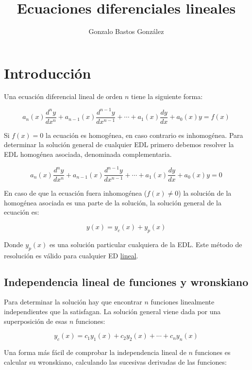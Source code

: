 \documentclass[a4paper,12pt,titlepage]{article}
\title{Ecuaciones diferenciales lineales}
\author{Gonzalo Bastos González}
\begin{document}
\section{Introducción}

Una ecuación diferencial lineal de orden $n$ tiene la siguiente forma:

\begin{equation}
    a_n(x) \frac{d^n y}{d x^n}+a_{n-1}(x) \frac{d^{n-1} y}{d x^{n-1}}+\cdots+a_1(x) \frac{d y}{d x}+a_0(x) y=f(x)
\end{equation}

Si $f(x)=0$ la ecuación es homogénea, en caso contrario es inhomogénea. Para determinar la solución general de cualquier EDL primero debemos resolver la EDL homogénea asociada, denominada complementaria.

\begin{equation}
    a_n(x) \frac{d^n y}{d x^n}+a_{n-1}(x) \frac{d^{n-1} y}{d x^{n-1}}+\cdots+a_1(x) \frac{d y}{d x}+a_0(x) y= 0
\end{equation}

\par En caso de que la ecuación fuera inhomogénea ($f(x)\neq 0$) la solución de la homogénea asociada es una parte de la solución, la solución general de la ecuación es:

\begin{equation}
    y(x) = y_c(x) + y_p(x)
\end{equation}

Donde $y_p(x)$ es una solución particular cualquiera de la EDL. Este método de resolución es válido para cualquier ED \underline{lineal}.

\subsection{Independencia lineal de funciones y wronskiano}

Para determinar la solución hay que encontrar $n$ funciones linealmente independientes que la satisfagan. La solución general viene dada por una superposición de esas $n$ funciones:

\begin{equation}
    y_{c}(x) = c_1y_1(x) + c_2y_2(x) + \cdots + c_ny_n(x)
\end{equation}

Una forma más fácil de comprobar la independencia lineal de $n$ funciones es calcular su wronskiano, calculando las sucesivas derivadas de las funciones:
\end{document}
